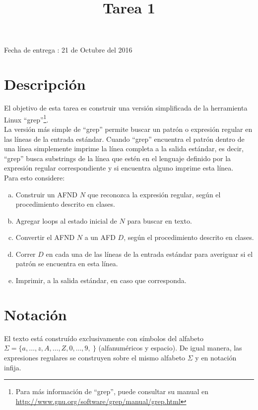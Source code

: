 \documentclass[dcc]{fcfmcourse}
\title{Tarea 1}
\begin{document}
\maketitle
\begin{center}
Fecha de entrega : 21 de Octubre del 2016
\end{center}
\vspace{-1ex}

\section*{Descripción}
El objetivo de esta tarea es construir una versión simplificada de la herramienta Linux ``grep''\footnote{Para más información de ``grep'', puede consultar su manual en \url{http://www.gnu.org/software/grep/manual/grep.html}}.\\
La versión más simple de ``grep'' permite buscar un patrón o expresión regular en las líneas de la entrada estándar. Cuando ``grep'' encuentra el patrón dentro de una línea simplemente imprime la línea completa a la salida estándar, es decir, ``grep'' busca substrings de la línea que estén en el lenguaje definido por la expresión regular correspondiente y si encuentra alguno imprime esta línea.\\

Para esto considere:
\begin{enumerate}[a)]
    \item Construir un AFND $N$ que reconozca la expresión regular, según el procedimiento descrito en clases.
    \item Agregar loops al estado inicial de $N$ para buscar en texto.
    \item Convertir el AFND $N$ a un AFD $D$, según el procedimiento descrito en clases.
    \item Correr $D$ en cada una de las líneas de la entrada estándar para averiguar si el patrón se encuentra en esta línea.
    \item Imprimir, a la salida estándar, en caso que corresponda.
\end{enumerate}

\section*{Notación}
El texto está construído exclusivamente con símbolos del alfabeto $\Sigma = \{a,\ldots,z,A,\ldots,Z,0,\ldots,9,\ \}$ (alfanuméricos y espacio). De igual manera, las expresiones regulares se construyen sobre el mismo alfabeto $\Sigma$ y en notación infija.\\
\end{document}
